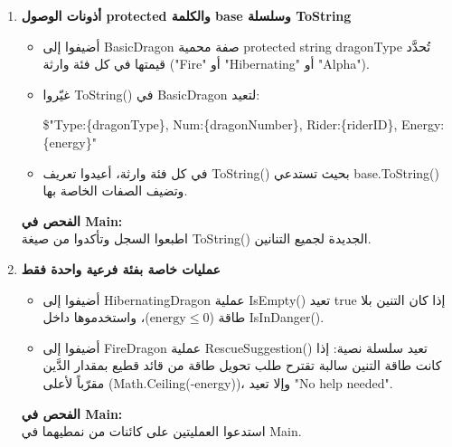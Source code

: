 \documentclass[14pt]{extarticle}
\begin{document}
\begin{enumerate}[resume, label=\textbf{تمرين \arabic*:}, wide=0pt, leftmargin=*, itemsep=2.2em]
    \item \textbf{أذونات الوصول \textenglish{protected} والكلمة \textenglish{base} وسلسلة \textenglish{ToString}}
    \begin{itemize}
        \item أضيفوا إلى \textenglish{BasicDragon} صفة محمية \textenglish{protected string dragonType} تُحدَّد قيمتها في كل فئة وارثة (\textenglish{"Fire"} أو \textenglish{"Hibernating"} أو \textenglish{"Alpha"}).
        \item غيّروا \textenglish{ToString()} في \textenglish{BasicDragon} لتعيد:
        \begin{center}
        \textenglish{\$"Type:\{dragonType\}, Num:\{dragonNumber\}, Rider:\{riderID\}, Energy:\{energy\}"}
        \end{center}
        \item في كل فئة وارثة، أعيدوا تعريف \textenglish{ToString()} بحيث تستدعي \textenglish{base.ToString()} وتضيف الصفات الخاصة بها.
    \end{itemize}
    \textbf{الفحص في \textenglish{Main}:} \\
    اطبعوا السجل وتأكدوا من صيغة \textenglish{ToString()} الجديدة لجميع التنانين.

\clearpage

    \item \textbf{عمليات خاصة بفئة فرعية واحدة فقط}
    \begin{itemize}
        \item أضيفوا إلى \textenglish{HibernatingDragon} عملية \textenglish{IsEmpty()} تعيد \textenglish{true} إذا كان التنين بلا طاقة ($\text{energy} \le 0$)، واستخدموها داخل \textenglish{IsInDanger()}.
        \item أضيفوا إلى \textenglish{FireDragon} عملية \textenglish{RescueSuggestion()} تعيد سلسلة نصية: إذا كانت طاقة التنين سالبة تقترح طلب تحويل طاقة من قائد قطيع بمقدار الدَّين مقرّباً لأعلى (\textenglish{Math.Ceiling(-energy)})، وإلا تعيد \textenglish{"No help needed"}.
    \end{itemize}
    \textbf{الفحص في \textenglish{Main}:} \\
    استدعوا العمليتين على كائنات من نمطيهما في \textenglish{Main}.


\end{enumerate}
\end{document}
